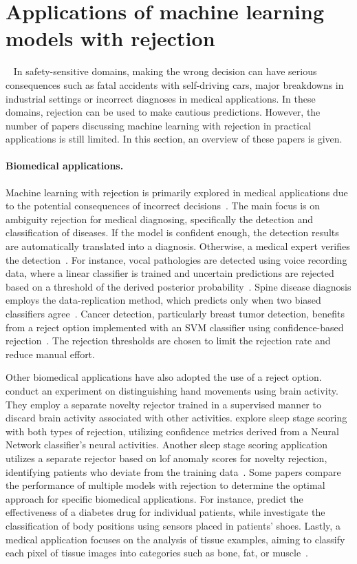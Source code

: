 \section{Applications of machine learning models with rejection}~\label{sec:applications}
In safety-sensitive domains, making the wrong decision can have serious consequences such as fatal accidents with self-driving cars, major breakdowns in industrial settings or incorrect diagnoses in medical applications. In these domains, rejection can be used to make cautious predictions. However, the number of papers discussing machine learning with rejection in practical applications is still limited. In this section, an overview of these papers is given. 

\paragraph{Biomedical applications.} Machine learning with rejection is primarily explored in medical applications due to the potential consequences of incorrect decisions~\citep{Liu2022}. The main focus is on ambiguity rejection for medical diagnosing, specifically the detection and classification of diseases. If the model is confident enough, the detection results are automatically translated into a diagnosis. Otherwise, a medical expert verifies the detection~\citep{Kompa2021}. For instance, vocal pathologies are detected using voice recording data, where a linear classifier is trained and uncertain predictions are rejected based on a threshold of the derived posterior probability~\citep{Kotropoulos2009}. Spine disease diagnosis employs the data-replication method, which predicts only when two biased classifiers agree~\citep{Sousa2009b}. Cancer detection, particularly breast tumor detection, benefits from a reject option implemented with an SVM classifier using confidence-based rejection~\citep{Guan2020}. The rejection thresholds are chosen to limit the rejection rate and reduce manual effort. 

Other biomedical applications have also adopted the use of a reject option. \citet{Lotte2008} conduct an experiment on distinguishing hand movements using brain activity. They employ a separate novelty rejector trained in a supervised manner to discard brain activity associated with other activities. \citet{Lewicke2008} explore sleep stage scoring with both types of rejection, utilizing confidence metrics derived from a Neural Network classifier's neural activities. Another sleep stage scoring application utilizes a separate rejector based on \gls{lof} anomaly scores for novelty rejection, identifying patients who deviate from the training data~\citep{VanderPlas2021}. Some papers compare the performance of multiple models with rejection to determine the optimal approach for specific biomedical applications. For instance, \citet{Kang2017} predict the effectiveness of a diabetes drug for individual patients, while \citet{Tang2014} investigate the classification of body positions using sensors placed in patients' shoes. Lastly, a medical application focuses on the analysis of tissue examples, aiming to classify each pixel of tissue images into categories such as bone, fat, or muscle~\citep{Condessa2013,Condessa2015a}.


